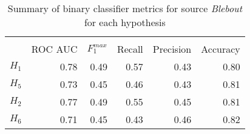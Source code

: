\begin{table}[htbp!] \centering
\caption{Summary of binary classifier metrics for source \textit{Blebout} for each hypothesis}
\label{tab:401_metrics_summary_Blebout}
\begin{tabular}{lrrrrr}
\\[-1.8ex]\hline\hline \\[-1.8ex]
 & ROC AUC & $F_1^{max}$ & Recall & Precision & Accuracy \\
\midrule
$H_1$ & 0.78 & 0.49 & 0.57 & 0.43 & 0.80 \\
$H_5$ & 0.73 & 0.45 & 0.46 & 0.43 & 0.81 \\
$H_2$ & 0.77 & 0.49 & 0.55 & 0.45 & 0.81 \\
$H_6$ & 0.71 & 0.45 & 0.43 & 0.46 & 0.82 \\
\bottomrule
\end{tabular}
\end{table}
